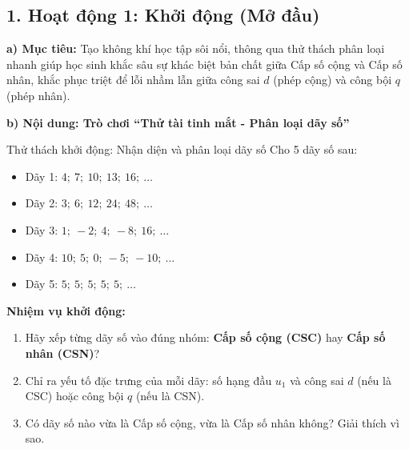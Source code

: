 \documentclass[12pt, a4paper]{article}
\begin{document}
\subsection*{1. Hoạt động 1: Khởi động (Mở đầu)}

\noindent \textbf{a) Mục tiêu:}
Tạo không khí học tập sôi nổi, thông qua thử thách phân loại nhanh giúp học sinh khắc sâu sự khác biệt bản chất giữa Cấp số cộng và Cấp số nhân, khắc phục triệt để lỗi nhầm lẫn giữa công sai $d$ (phép cộng) và công bội $q$ (phép nhân).

\noindent \textbf{b) Nội dung: Trò chơi ``Thử tài tinh mắt - Phân loại dãy số''}
\begin{pedabox}{Thử thách khởi động: Nhận diện và phân loại dãy số}
Cho 5 dãy số sau:
\begin{itemize}[leftmargin=0.6cm]
    \item Dãy 1: $4; \ 7; \ 10; \ 13; \ 16; \ \dots$
    \item Dãy 2: $3; \ 6; \ 12; \ 24; \ 48; \ \dots$
    \item Dãy 3: $1; \ -2; \ 4; \ -8; \ 16; \ \dots$
    \item Dãy 4: $10; \ 5; \ 0; \ -5; \ -10; \ \dots$
    \item Dãy 5: $5; \ 5; \ 5; \ 5; \ 5; \ \dots$
\end{itemize}
\textbf{Nhiệm vụ khởi động:}
\begin{enumerate}[leftmargin=0.6cm]
    \item Hãy xếp từng dãy số vào đúng nhóm: \textbf{Cấp số cộng (CSC)} hay \textbf{Cấp số nhân (CSN)}?
    \item Chỉ ra yếu tố đặc trưng của mỗi dãy: số hạng đầu $u_1$ và công sai $d$ (nếu là CSC) hoặc công bội $q$ (nếu là CSN).
    \item Có dãy số nào vừa là Cấp số cộng, vừa là Cấp số nhân không? Giải thích vì sao.
\end{enumerate}
\end{pedabox}
\end{document}

